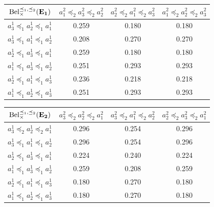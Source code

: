 \begin{example}
\begin{center}
\vspace{0.5cm}

\begin{tabular}{|c||c|c|c|}
\hline
${\mathrm{Bel}}^{\preceq_1,\preceq_2}_\times(\mathbf{E_1})$ & $a^2_1\preceq_2a^2_3\preceq_2a^2_2$ & $a^2_2\preceq_2a^2_1\preceq_2a^2_3$ & $a^2_1\preceq_2a^2_2\preceq_2a^2_3$ \\ \hline\hline
$a^1_3\preceq_1a^1_2\preceq_1a^1_1$ & 0.259 & 0.180 & 0.180 \\ \hline
$a^1_3\preceq_1a^1_1\preceq_1a^1_2$ & 0.208 & 0.270 & 0.270 \\ \hline
$a^1_2\preceq_1a^1_3\preceq_1a^1_1$ & 0.259 & 0.180 & 0.180 \\ \hline
$a^1_1\preceq_1a^1_3\preceq_1a^1_2$ & 0.251 & 0.293 & 0.293 \\ \hline
$a^1_2\preceq_1a^1_1\preceq_1a^1_3$ & 0.236 & 0.218 & 0.218 \\ \hline
$a^1_1\preceq_1a^1_2\preceq_1a^1_3$ & 0.251 & 0.293 & 0.293 \\ \hline
\end{tabular}

\vspace{1cm}

\begin{tabular}{|c||c|c|c|}
\hline
${\mathrm{Bel}}^{\preceq_1,\preceq_2}_\times(\mathbf{E_2})$ & $a^2_3\preceq_2a^2_2\preceq_2a^2_1$ & $a^2_3\preceq_2a^2_1\preceq_2a^2_2$ & $a^2_2\preceq_2a^2_3\preceq_2a^2_1$ \\ \hline\hline
$a^1_3\preceq_2a^1_2\preceq_2a^1_1$ & 0.296 & 0.254 & 0.296 \\ \hline
$a^1_3\preceq_1a^1_1\preceq_1a^1_2$ & 0.296 & 0.254 & 0.296 \\ \hline
$a^1_2\preceq_1a^1_3\preceq_1a^1_1$ & 0.224 & 0.240 & 0.224 \\ \hline
$a^1_1\preceq_1a^1_3\preceq_1a^1_2$ & 0.259 & 0.208 & 0.259 \\ \hline
$a^1_2\preceq_1a^1_1\preceq_1a^1_3$ & 0.180 & 0.270 & 0.180 \\ \hline
$a^1_1\preceq_1a^1_2\preceq_1a^1_3$ & 0.180 & 0.270 & 0.180 \\ \hline
\end{tabular}

\vspace{0.5cm}


\end{center}
\end{example}

